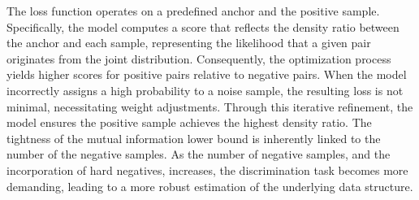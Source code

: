 The loss function operates on a predefined anchor and the positive sample. 
Specifically, the model computes a score that reflects the density ratio between the anchor and each sample, representing the likelihood that a given pair originates from the joint distribution. 
Consequently, the optimization process yields higher scores for positive pairs relative to negative pairs. 
When the model incorrectly assigns a high probability to a noise sample, the resulting loss is not minimal, necessitating weight adjustments. 
Through this iterative refinement, the model ensures the positive sample achieves the highest density ratio. 
The tightness of the mutual information lower bound is inherently linked to the number of the negative samples. 
As the number of negative samples, and the incorporation of hard negatives, increases, the discrimination task becomes more demanding, leading to a more robust estimation of the underlying data structure.






